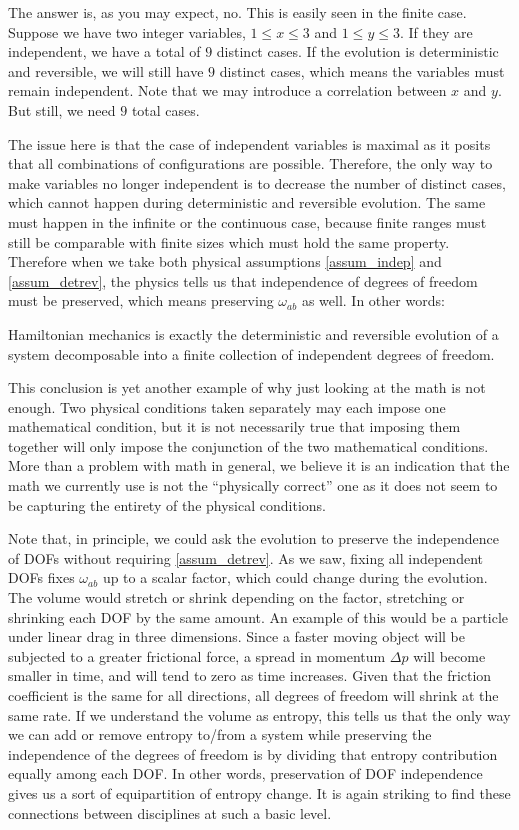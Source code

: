 The answer is, as you may expect, no. This is easily seen in the finite case. Suppose we have two integer variables, $1 \leq x \leq 3$ and $1 \leq y \leq 3$. If they are independent, we have a total of $9$ distinct cases. If the evolution is deterministic and reversible, we will still have $9$ distinct cases, which means the variables must remain independent. Note that we may introduce a correlation between $x$ and $y$. But still, we need $9$ total cases.

The issue here is that the case of independent variables is maximal as it posits that all combinations of configurations are possible. Therefore, the only way to make variables no longer independent is to decrease the number of distinct cases, which cannot happen during deterministic and reversible evolution. The same must happen in the infinite or the continuous case, because finite ranges must still be comparable with finite sizes which must hold the same property. Therefore when we take both physical assumptions \ref{assum_indep} and \ref{assum_detrev}, the physics tells us that independence of degrees of freedom must be preserved, which means preserving $\omega_{ab}$ as well. In other words:
\begin{insight}
	Hamiltonian mechanics is exactly the deterministic and reversible evolution of a system decomposable into a finite collection of independent degrees of freedom.
\end{insight} 

This conclusion is yet another example of why just looking at the math is not enough. Two physical conditions taken separately may each impose one mathematical condition, but it is not necessarily true that imposing them together will only impose the conjunction of the two mathematical conditions. More than a problem with math in general, we believe it is an indication that the math we currently use is not the ``physically correct'' one as it does not seem to be capturing the entirety of the physical conditions. 

Note that, in principle, we could ask the evolution to preserve the independence of DOFs without requiring \ref{assum_detrev}. As we saw, fixing all independent DOFs fixes $\omega_{ab}$ up to a scalar factor, which could change during the evolution. The volume would stretch or shrink depending on the factor, stretching or shrinking each DOF by the same amount. An example of this would be a particle under linear drag in three dimensions. Since a faster moving object will be subjected to a greater frictional force, a spread in momentum $\Delta p$ will become smaller in time, and will tend to zero as time increases. Given that the friction coefficient is the same for all directions, all degrees of freedom will shrink at the same rate. If we understand the volume as entropy, this tells us that the only way we can add or remove entropy to/from a system while preserving the independence of the degrees of freedom is by dividing that entropy contribution equally among each DOF. In other words, preservation of DOF independence gives us a sort of equipartition of entropy change. It is again striking to find these connections between disciplines at such a basic level.

